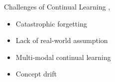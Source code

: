 \documentclass[t]{beamer}
\begin{document}


\begin{frame}{Challenges of Continual Learning \cite{Gupta23}, \cite{Yang24}}
  \vspace{1cm}
  \begin{itemize}
    \item Catastrophic forgetting
    \newline
    \item Lack of real-world assumption
    \newline
    \item Multi-modal continual learning
    \newline
    \item Concept drift
  \end{itemize}
\end{frame}
\end{document}
